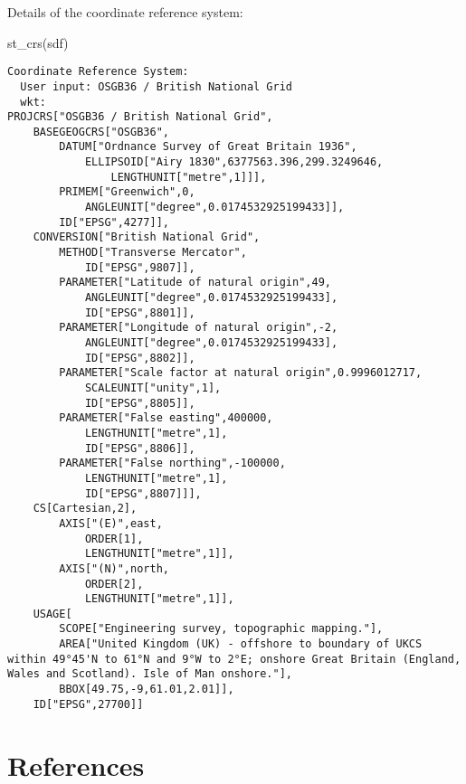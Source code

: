 \documentclass[
  letterpaper,
  krantz2]{style/krantz}
\newenvironment{Shaded}{\begin{snugshade}}{\end{snugshade}}
\newcommand{\FunctionTok}[1]{\textcolor[rgb]{0.28,0.35,0.67}{#1}}
\newcommand{\NormalTok}[1]{\textcolor[rgb]{0.00,0.23,0.31}{#1}}
\begin{document}
Details of the coordinate reference system:

\begin{Shaded}
\begin{Highlighting}[]
\FunctionTok{st\_crs}\NormalTok{(sdf)}
\end{Highlighting}
\end{Shaded}

\begin{verbatim}
Coordinate Reference System:
  User input: OSGB36 / British National Grid 
  wkt:
PROJCRS["OSGB36 / British National Grid",
    BASEGEOGCRS["OSGB36",
        DATUM["Ordnance Survey of Great Britain 1936",
            ELLIPSOID["Airy 1830",6377563.396,299.3249646,
                LENGTHUNIT["metre",1]]],
        PRIMEM["Greenwich",0,
            ANGLEUNIT["degree",0.0174532925199433]],
        ID["EPSG",4277]],
    CONVERSION["British National Grid",
        METHOD["Transverse Mercator",
            ID["EPSG",9807]],
        PARAMETER["Latitude of natural origin",49,
            ANGLEUNIT["degree",0.0174532925199433],
            ID["EPSG",8801]],
        PARAMETER["Longitude of natural origin",-2,
            ANGLEUNIT["degree",0.0174532925199433],
            ID["EPSG",8802]],
        PARAMETER["Scale factor at natural origin",0.9996012717,
            SCALEUNIT["unity",1],
            ID["EPSG",8805]],
        PARAMETER["False easting",400000,
            LENGTHUNIT["metre",1],
            ID["EPSG",8806]],
        PARAMETER["False northing",-100000,
            LENGTHUNIT["metre",1],
            ID["EPSG",8807]]],
    CS[Cartesian,2],
        AXIS["(E)",east,
            ORDER[1],
            LENGTHUNIT["metre",1]],
        AXIS["(N)",north,
            ORDER[2],
            LENGTHUNIT["metre",1]],
    USAGE[
        SCOPE["Engineering survey, topographic mapping."],
        AREA["United Kingdom (UK) - offshore to boundary of UKCS within 49°45'N to 61°N and 9°W to 2°E; onshore Great Britain (England, Wales and Scotland). Isle of Man onshore."],
        BBOX[49.75,-9,61.01,2.01]],
    ID["EPSG",27700]]
\end{verbatim}


\hypertarget{references}{%
\chapter*{References}\label{references}}

\end{document}
